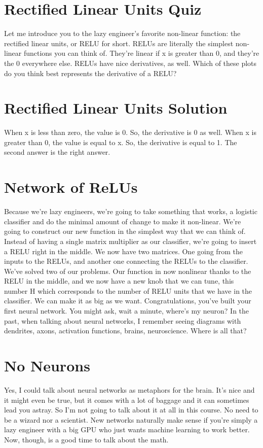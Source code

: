 \documentclass{article}
\begin{document}
\section{Rectified Linear Units Quiz}
Let me introduce you to the lazy
engineer's favorite non-linear function:
the rectified linear units,
or RELU for short.
RELUs are literally the simplest
non-linear functions you can think of.
They're linear if x is greater than 0,
and they're the 0 everywhere else.
RELUs have nice derivatives, as well.
Which of these plots do you think best
represents the derivative of a RELU?
\section{Rectified Linear Units Solution}
When x is less than zero,
the value is 0.
So, the derivative is 0 as well.
When x is greater than 0,
the value is equal to x.
So, the derivative is equal to 1.
The second answer is the right answer.
\section{Network of ReLUs}
Because we're lazy engineers, we're
going to take something that works,
a logistic classifier and do the minimal
amount of change to make it non-linear.
We're going to construct our new
function in the simplest way that we can
think of.
Instead of having a single matrix
multiplier as our classifier,
we're going to insert
a RELU right in the middle.
We now have two matrices.
One going from the inputs to the RELUs,
and
another one connecting
the RELUs to the classifier.
We've solved two of our problems.
Our function in now nonlinear thanks
to the RELU in the middle, and
we now have a new knob that we can tune,
this number H which
corresponds to the number of RELU
units that we have in the classifier.
We can make it as big as we want.
Congratulations, you've built
your first neural network.
You might ask, wait a minute,
where's my neuron?
In the past, when talking about neural
networks, I remember seeing diagrams
with dendrites, axons, activation
functions, brains, neuroscience.
Where is all that?
\section{No Neurons}
Yes, I could talk about neural
networks as metaphors for the brain.
It's nice and it might even be true,
but it comes with a lot of baggage and
it can sometimes lead you astray.
So I'm not going to talk about
it at all in this course.
No need to be a wizard nor a scientist.
New networks naturally make sense
if you're simply a lazy engineer
with a big GPU who just wants
machine learning to work better.
Now, though,
is a good time to talk about the math.
\end{document}
